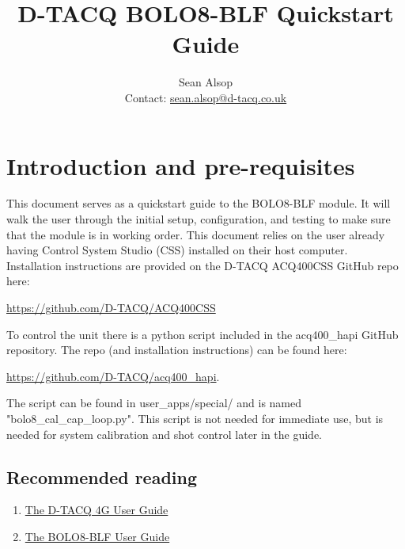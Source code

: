 \documentclass{article}
\begin{document}
\title{D-TACQ BOLO8-BLF Quickstart Guide}
\author{Sean Alsop \\ Contact: \href{mailto:sean.alsop@d-tacq.co.uk}{sean.alsop@d-tacq.co.uk} }

\maketitle


\section{Introduction and pre-requisites}
This document serves as a quickstart guide to the BOLO8-BLF module.
It will walk the user through the initial setup, configuration, and testing to make sure that the module is in working order.
This document relies on the user already having Control System Studio (CSS) installed on their host computer.
Installation instructions are provided on the D-TACQ ACQ400CSS GitHub repo here:
\newline
\centerline{ \href{https://github.com/D-TACQ/ACQ400CSS}{https://github.com/D-TACQ/ACQ400CSS} }
\newline
To control the unit there is a python script included in the acq400\_hapi GitHub repository.
The repo (and installation instructions) can be found here:
\newline
\centerline{ \href{https://github.com/D-TACQ/acq400_hapi}{https://github.com/D-TACQ/acq400\_hapi}. }
\newline
The script can be found in user\_apps/special/ and is named "bolo8\_cal\_cap\_loop.py".
This script is not needed for immediate use, but is needed for system calibration and shot control later in the guide.
\subsection{Recommended reading}
\begin{enumerate}
	\item \href{http://www.d-tacq.com/resources/d-tacq-4G-acq4xx-UserGuide-r28.pdf}{The D-TACQ 4G User Guide}
	\item \href{http://www.d-tacq.com/resources/Bolo_calibration_report_user-guide.pdf}{The BOLO8-BLF User Guide}
\end{enumerate}
\end{document}
